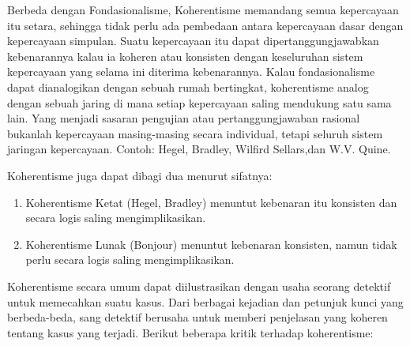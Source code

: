 \documentclass[10pt,a4paper]{article}
\def\tightlist{}
\begin{document}
\begin{multicols}{2}
\begin{itemize}
  Berbeda dengan Fondasionalisme, Koherentisme memandang semua
  kepercayaan itu setara, sehingga tidak perlu ada pembedaan antara
  kepercayaan dasar dengan kepercayaan simpulan. Suatu kepercayaan itu
  dapat dipertanggungjawabkan kebenarannya kalau ia koheren atau
  konsisten dengan keseluruhan sistem kepercayaan yang selama ini
  diterima kebenarannya. Kalau fondasionalisme dapat dianalogikan dengan
  sebuah rumah bertingkat, koherentisme analog dengan sebuah jaring di
  mana setiap kepercayaan saling mendukung satu sama lain. Yang menjadi
  sasaran pengujian atau pertanggungjawaban rasional bukanlah
  kepercayaan masing-masing secara individual, tetapi seluruh sistem
  jaringan kepercayaan. Contoh: Hegel, Bradley, Wilfird Sellars,dan W.V.
  Quine.

  Koherentisme juga dapat dibagi dua menurut sifatnya:

  \begin{enumerate}
  \def\labelenumi{\arabic{enumi}.}
  \tightlist
  \item
    Koherentisme Ketat (Hegel, Bradley) menuntut kebenaran itu konsisten
    dan secara logis saling mengimplikasikan.
  \item
    Koherentisme Lunak (Bonjour) menuntut kebenaran konsisten, namun
    tidak perlu secara logis saling mengimplikasikan.
  \end{enumerate}

  Koherentisme secara umum dapat diilustrasikan dengan usaha seorang
  detektif untuk memecahkan suatu kasus. Dari berbagai kejadian dan
  petunjuk kunci yang berbeda-beda, sang detektif berusaha untuk memberi
  penjelasan yang koheren tentang kasus yang terjadi. Berikut beberapa
  kritik terhadap koherentisme:


\end{itemize}
\end{multicols}
\end{document}

